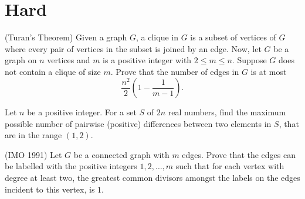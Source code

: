 \documentclass{article}
\begin{document}
\section{Hard}
\begin{exercise}(Turan's Theorem)
Given a graph $G$, a clique in $G$ is a subset of vertices of $G$ where every pair of vertices in the subset is joined by an edge. Now, let $G$ be a graph on $n$ vertices and $m$ is a positive integer with $2 \leq m \leq n$. Suppose $G$ does not contain a clique of size $m$. Prove that the number of edges in $G$ is at most 
\[\frac{n^{2}}{2}\left(1 - \frac{1}{m - 1}\right). 
\]
\end{exercise}

\begin{exercise}
Let $n$ be a positive integer. For a set $S$ of $2n$ real numbers, find the maximum possible number of pairwise (positive) differences between two elements in $S$, that are in the range $(1, 2)$.
\end{exercise}

\begin{exercise}(IMO 1991)
Let $G$ be a connected graph with $m$ edges. Prove that the edges can be labelled with the positive integers $1, 2, \ldots, m$ such that for each vertex with degree at least two, the greatest common divisors amongst the labels on the edges incident to this vertex, is $1$.
\end{exercise}
\end{document}
